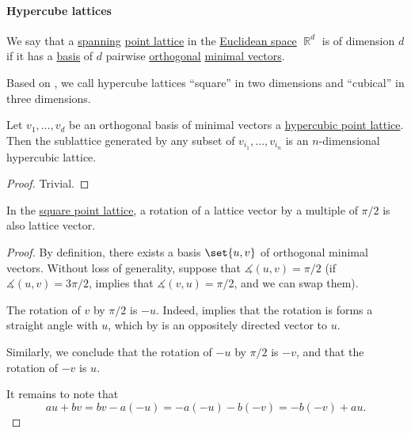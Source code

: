 \paragraph{Hypercube lattices}

\begin{definition}\label{def:hypercubic_point_lattice}
  We say that a \hyperref[thm:span_via_linear_combinations]{spanning} \hyperref[def:point_lattice]{point lattice} in the \hyperref[def:euclidean_plane]{Euclidean space} \( \BbbR^d \) is  of dimension \( d \) if it has a \hyperref[def:point_lattice_basis]{basis} of \( d \) pairwise \hyperref[def:orthogonality]{orthogonal} \hyperref[def:minimal_lattice_vector]{minimal vectors}.

  Based on , we call hypercube lattices \enquote{square} in two dimensions and \enquote{cubical} in three dimensions.
\end{definition}

\begin{proposition}\label{thm:hypercubic_point_sublattice}
  Let \( v_1, \ldots, v_d \) be an orthogonal basis of minimal vectors a \hyperref[def:hypercubic_point_lattice]{hypercubic point lattice}. Then the sublattice generated by any subset of \( v_{i_1}, \ldots, v_{i_n} \) is an \( n \)-dimensional hypercubic lattice.
\end{proposition}
\begin{proof}
  Trivial.
\end{proof}

\begin{proposition}\label{thm:hypercubic_point_lattice_vector_rotation}
  In the \hyperref[def:hypercubic_point_lattice]{square point lattice}, a rotation of a lattice vector by a multiple of \( \pi / 2 \) is also lattice vector.
\end{proposition}
\begin{proof}
  By definition, there exists a basis \( \set{ u, v } \) of orthogonal minimal vectors. Without loss of generality, suppose that \( \measuredangle(u, v) = \pi / 2 \) (if \( \measuredangle(u, v) = 3\pi / 2 \),  implies that \( \measuredangle(v, u) = \pi / 2 \), and we can swap them).

  The rotation of \( v \) by \( \pi / 2 \) is \( -u \). Indeed,  implies that the rotation is forms a straight angle with \( u \), which by  is an oppositely directed vector to \( u \).

  Similarly, we conclude that the rotation of \( -u \) by \( \pi / 2 \) is \( -v \), and that the rotation of \( -v \) is \( u \).

  It remains to note that
  \begin{equation*}
    au + bv = bv - a(-u) = -a(-u) - b(-v) = -b(-v) + au.
  \end{equation*}
\end{proof}

